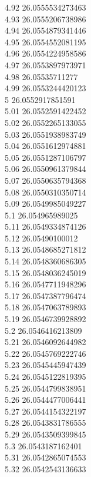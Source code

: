 {4.92	26.0555534273463\\
4.93	26.0555206738986\\
4.94	26.0554879341446\\
4.95	26.0554552081195\\
4.96	26.0554224958586\\
4.97	26.0553897973971\\
4.98	26.05535711277\\
4.99	26.0553244420123\\
5	26.0552917851591\\
5.01	26.0552591422452\\
5.02	26.0552265133055\\
5.03	26.0551938983749\\
5.04	26.0551612974881\\
5.05	26.0551287106797\\
5.06	26.0550961379844\\
5.07	26.0550635794368\\
5.08	26.0550310350714\\
5.09	26.0549985049227\\
5.1	26.054965989025\\
5.11	26.0549334874126\\
5.12	26.05490100012\\
5.13	26.0548685271812\\
5.14	26.0548360686305\\
5.15	26.0548036245019\\
5.16	26.0547711948296\\
5.17	26.0547387796474\\
5.18	26.0547063789893\\
5.19	26.0546739928892\\
5.2	26.0546416213809\\
5.21	26.0546092644982\\
5.22	26.0545769222746\\
5.23	26.0545445947439\\
5.24	26.0545122819395\\
5.25	26.0544799838951\\
5.26	26.0544477006441\\
5.27	26.0544154322197\\
5.28	26.0543831786555\\
5.29	26.0543509399845\\
5.3	26.0543187162401\\
5.31	26.0542865074553\\
5.32	26.0542543136633\\
}
